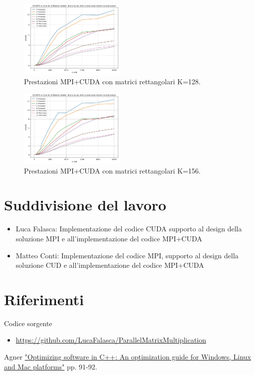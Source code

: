 \documentclass[conference]{IEEEtran}
\begin{document}
\begin{figure}[H]
    \centering
    \includegraphics[width=0.45\textwidth]{resources/mpi_cuda_128.jpg}
    \caption{Prestazioni MPI+CUDA con matrici rettangolari K=128.}
    \label{fig:mpi_cuda_128}
\end{figure}
\begin{figure}[H]
    \centering
    \includegraphics[width=0.45\textwidth]{resources/mpi_cuda_156.jpg}
    \caption{Prestazioni MPI+CUDA con matrici rettangolari K=156.}
    \label{fig:mpi_cuda_156}
\end{figure}
\section{Suddivisione del lavoro}
\begin{itemize}
    \item Luca Falasca: Implementazione del codice CUDA supporto al design della soluzione MPI e all'implementazione del codice MPI+CUDA
    \item Matteo Conti: Implementazione del codice MPI, supporto al design della soluzione CUD e all'implementazione del codice MPI+CUDA
\end{itemize}
\section{Riferimenti}
Codice sorgente
\begin{itemize}
    \item \href{https://github.com/LucaFalasca/ParallelMatrixMultiplication}{https://github.com/LucaFalasca/ParallelMatrixMultiplication}
\end{itemize}
\begin{thebibliography}{00}
     Agner \href{https://www.agner.org/optimize/optimizing_cpp.pdf}{"Optimizing software in C++: An optimization guide for Windows, Linux and Mac platforms"} pp. 91-92.
\end{thebibliography}
\vspace{12pt}
\end{document}

